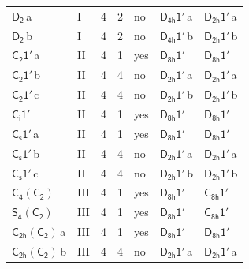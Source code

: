 \documentclass[10pt,a4paper]{article}
\numberwithin{equation}{section}
\newcommand{\grp}[1]{\mathsf{#1}}
\newcommand{\clsletter}[1]{\,{\scriptsize\color{black!55}#1}}
\begin{document}
{\begin{longtable}{@{}llrrlll@{}}
\href{../../../rotation/data/pdf/D2.pdf}{$\grp{D_{2}}$}\clsletter{a} & I & 4 & 2 & no & \href{D4h-1p.pdf}{$\grp{D_{4h}1'}$}\clsletter{a} & \href{D2h-1p.pdf}{$\grp{D_{2h}1'}$}\clsletter{a}\\
\href{../../../rotation/data/pdf/D2.pdf}{$\grp{D_{2}}$}\clsletter{b} & I & 4 & 2 & no & \href{D4h-1p.pdf}{$\grp{D_{4h}1'}$}\clsletter{b} & \href{D2h-1p.pdf}{$\grp{D_{2h}1'}$}\clsletter{b}\\
\href{C2-1p.pdf}{$\grp{C_{2}1'}$}\clsletter{a} & II & 4 & 1 & yes & \href{D8h-1p.pdf}{$\grp{D_{8h}1'}$} & \href{D8h-1p.pdf}{$\grp{D_{8h}1'}$}\\
\href{C2-1p.pdf}{$\grp{C_{2}1'}$}\clsletter{b} & II & 4 & 4 & no & \href{D2h-1p.pdf}{$\grp{D_{2h}1'}$}\clsletter{a} & \href{D2h-1p.pdf}{$\grp{D_{2h}1'}$}\clsletter{a}\\
\href{C2-1p.pdf}{$\grp{C_{2}1'}$}\clsletter{c} & II & 4 & 4 & no & \href{D2h-1p.pdf}{$\grp{D_{2h}1'}$}\clsletter{b} & \href{D2h-1p.pdf}{$\grp{D_{2h}1'}$}\clsletter{b}\\
\href{S2-1p.pdf}{$\grp{C_{i}1'}$} & II & 4 & 1 & yes & \href{D8h-1p.pdf}{$\grp{D_{8h}1'}$} & \href{D8h-1p.pdf}{$\grp{D_{8h}1'}$}\\
\href{C1v-1p.pdf}{$\grp{C_{s}1'}$}\clsletter{a} & II & 4 & 1 & yes & \href{D8h-1p.pdf}{$\grp{D_{8h}1'}$} & \href{D8h-1p.pdf}{$\grp{D_{8h}1'}$}\\
\href{C1v-1p.pdf}{$\grp{C_{s}1'}$}\clsletter{b} & II & 4 & 4 & no & \href{D2h-1p.pdf}{$\grp{D_{2h}1'}$}\clsletter{a} & \href{D2h-1p.pdf}{$\grp{D_{2h}1'}$}\clsletter{a}\\
\href{C1v-1p.pdf}{$\grp{C_{s}1'}$}\clsletter{c} & II & 4 & 4 & no & \href{D2h-1p.pdf}{$\grp{D_{2h}1'}$}\clsletter{b} & \href{D2h-1p.pdf}{$\grp{D_{2h}1'}$}\clsletter{b}\\
\href{C4-C2.pdf}{$\grp{C_{4}}(\grp{C_{2}})$} & III & 4 & 1 & yes & \href{D8h-1p.pdf}{$\grp{D_{8h}1'}$} & \href{C8h-1p.pdf}{$\grp{C_{8h}1'}$}\\
\href{S4-C2.pdf}{$\grp{S_{4}}(\grp{C_{2}})$} & III & 4 & 1 & yes & \href{D8h-1p.pdf}{$\grp{D_{8h}1'}$} & \href{C8h-1p.pdf}{$\grp{C_{8h}1'}$}\\
\href{C2h-C2.pdf}{$\grp{C_{2h}}(\grp{C_{2}})$}\clsletter{a} & III & 4 & 1 & yes & \href{D8h-1p.pdf}{$\grp{D_{8h}1'}$} & \href{D8h-1p.pdf}{$\grp{D_{8h}1'}$}\\
\href{C2h-C2.pdf}{$\grp{C_{2h}}(\grp{C_{2}})$}\clsletter{b} & III & 4 & 4 & no & \href{D2h-1p.pdf}{$\grp{D_{2h}1'}$}\clsletter{a} & \href{D2h-1p.pdf}{$\grp{D_{2h}1'}$}\clsletter{a}\\

\end{longtable}}
\end{document}
